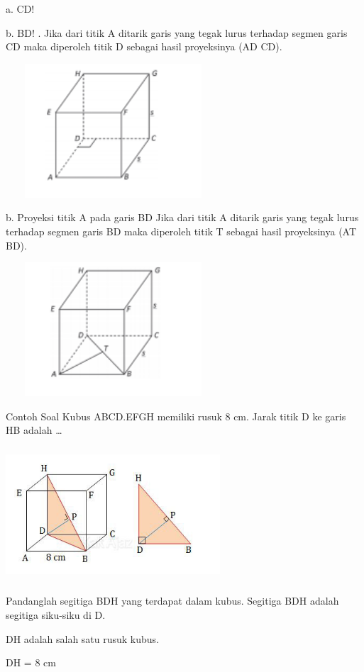 \documentclass[11pt,fleqn]{book} %
\begin{document}
a. CD!

b. BD!
.
Jika dari titik A ditarik garis yang tegak lurus terhadap
segmen garis CD maka diperoleh titik D sebagai hasil
proyeksinya (AD CD). 

\includegraphics[width = 8cm, height= 5cm]{Pictures/gi6.png}

b. Proyeksi titik A pada garis BD
Jika dari titik A ditarik garis yang tegak lurus
terhadap segmen garis BD maka diperoleh titik T
sebagai hasil proyeksinya (AT  BD).

\includegraphics[width = 8cm, height= 5cm]{Pictures/gi7.png}

Contoh Soal
Kubus ABCD.EFGH memiliki rusuk 8 cm. Jarak titik D ke garis HB adalah …

\includegraphics[width = 8cm, height= 5cm]{Pictures/gi8.png}

Pandanglah segitiga BDH yang terdapat dalam kubus. Segitiga BDH adalah segitiga siku-siku di D.

DH adalah salah satu rusuk kubus.

DH = 8 cm
\end{document}
